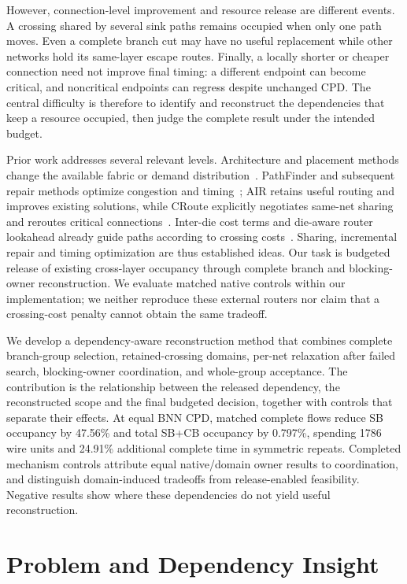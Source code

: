 \documentclass[conference,10pt]{IEEEtran}
\begin{document}
However, connection-level improvement and resource release are different events. A crossing shared by several sink paths remains occupied when only one path moves. Even a complete branch cut may have no useful replacement while other networks hold its same-layer escape routes. Finally, a locally shorter or cheaper connection need not improve final timing: a different endpoint can become critical, and noncritical endpoints can regress despite unchanged CPD. The central difficulty is therefore to identify and reconstruct the dependencies that keep a resource occupied, then judge the complete result under the intended budget.

Prior work addresses several relevant levels. Architecture and placement methods change the available fabric or demand distribution~\cite{lazagna,flatland}. PathFinder and subsequent repair methods optimize congestion and timing~\cite{pathfinder,liurepair}; AIR retains useful routing and improves existing solutions, while CRoute explicitly negotiates same-net sharing and reroutes critical connections~\cite{air,croute}. Inter-die cost terms and die-aware router lookahead already guide paths according to crossing costs~\cite{nasiri,multidie}. Sharing, incremental repair and timing optimization are thus established ideas. Our task is budgeted release of existing cross-layer occupancy through complete branch and blocking-owner reconstruction. We evaluate matched native controls within our implementation; we neither reproduce these external routers nor claim that a crossing-cost penalty cannot obtain the same tradeoff.

We develop a dependency-aware reconstruction method that combines complete branch-group selection, retained-crossing domains, per-net relaxation after failed search, blocking-owner coordination, and whole-group acceptance. The contribution is the relationship between the released dependency, the reconstructed scope and the final budgeted decision, together with controls that separate their effects. At equal BNN CPD, matched complete flows reduce SB occupancy by 47.56\% and total SB+CB occupancy by 0.797\%, spending 1786 wire units and 24.91\% additional complete time in symmetric repeats. Completed mechanism controls attribute equal native/domain owner results to coordination, and distinguish domain-induced tradeoffs from release-enabled feasibility. Negative results show where these dependencies do not yield useful reconstruction.

\section{Problem and Dependency Insight}
\end{document}
